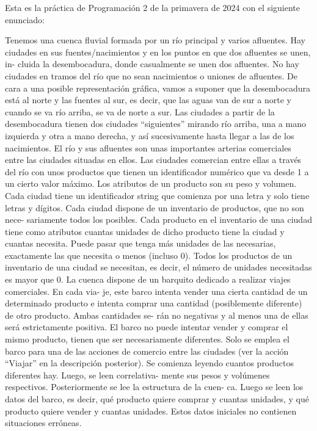 Esta es la práctica de Programación 2 de la primavera de 2024 con el siguiente enunciado\+:

Tenemos una cuenca fluvial formada por un río principal y varios afluentes. Hay ciudades en sus fuentes/nacimientos y en los puntos en que dos afluentes se unen, in-\/ cluida la desembocadura, donde casualmente se unen dos afluentes. No hay ciudades en tramos del río que no sean nacimientos o uniones de afluentes. De cara a una posible representación gráfica, vamos a suponer que la desembocadura está al norte y las fuentes al sur, es decir, que las aguas van de sur a norte y cuando se va río arriba, se va de norte a sur. Las ciudades a partir de la desembocadura tienen dos ciudades “siguientes” mirando río arriba, una a mano izquierda y otra a mano derecha, y así sucesivamente hasta llegar a las de los nacimientos. El río y sus afluentes son unas importantes arterias comerciales entre las ciudades situadas en ellos. Las ciudades comercian entre ellas a través del río con unos productos que tienen un identificador numérico que va desde 1 a un cierto valor máximo. Los atributos de un producto son su peso y volumen. Cada ciudad tiene un identificador string que comienza por una letra y solo tiene letras y dígitos. Cada ciudad dispone de un inventario de productos, que no son nece-\/ sariamente todos los posibles. Cada producto en el inventario de una ciudad tiene como atributos cuantas unidades de dicho producto tiene la ciudad y cuantas necesita. Puede pasar que tenga más unidades de las necesarias, exactamente las que necesita o menos (incluso 0). Todos los productos de un inventario de una ciudad se necesitan, es decir, el número de unidades necesitadas es mayor que 0. La cuenca dispone de un barquito dedicado a realizar viajes comerciales. En cada via-\/ je, este barco intenta vender una cierta cantidad de un determinado producto e intenta comprar una cantidad (posiblemente diferente) de otro producto. Ambas cantidades se-\/ rán no negativas y al menos una de ellas será estrictamente positiva. El barco no puede intentar vender y comprar el mismo producto, tienen que ser necesariamente diferentes. Solo se emplea el barco para una de las acciones de comercio entre las ciudades (ver la acción “\+Viajar” en la descripción posterior). Se comienza leyendo cuantos productos diferentes hay. Luego, se leen correlativa-\/ mente sus pesos y volúmenes respectivos. Posteriormente se lee la estructura de la cuen-\/ ca. Luego se leen los datos del barco, es decir, qué producto quiere comprar y cuantas unidades, y qué producto quiere vender y cuantas unidades. Estos datos iniciales no contienen situaciones erróneas.


